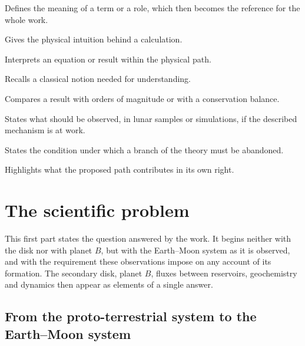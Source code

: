 \documentclass[11pt,a4paper,openany]{report}
\begin{document}
\begin{definition}
Defines the meaning of a term or a role, which then becomes the reference for the whole work.
\end{definition}
\begin{ideephys}
Gives the physical intuition behind a calculation.
\end{ideephys}
\begin{lecture}
Interprets an equation or result within the physical path.
\end{lecture}
\begin{rappel}
Recalls a classical notion needed for understanding.
\end{rappel}
\begin{controle}
Compares a result with orders of magnitude or with a conservation balance.
\end{controle}
\begin{consequence}
States what should be observed, in lunar samples or simulations, if the described mechanism is at work.
\end{consequence}
\begin{falsif}
States the condition under which a branch of the theory must be abandoned.
\end{falsif}
\begin{apport}
Highlights what the proposed path contributes in its own right.
\end{apport}

\clearpage
\tableofcontents

\clearpage
{}
\part{The scientific problem}

\noindent
This first part states the question answered by the work. It begins neither with the disk nor with
planet $B$, but with the Earth--Moon system as it is observed, and with the requirement these
observations impose on any account of its formation. The secondary disk, planet $B$, fluxes between
reservoirs, geochemistry and dynamics then appear as elements of a single answer.

\chapter{From the proto-terrestrial system to the Earth--Moon system}
\end{document}
